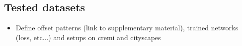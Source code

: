 
\subsection{Tested datasets}
\begin{itemize}
\item Define offset patterns (link to supplementary material), trained networks (loss, etc...) and setups on cremi and cityscapes 
\end{itemize}
